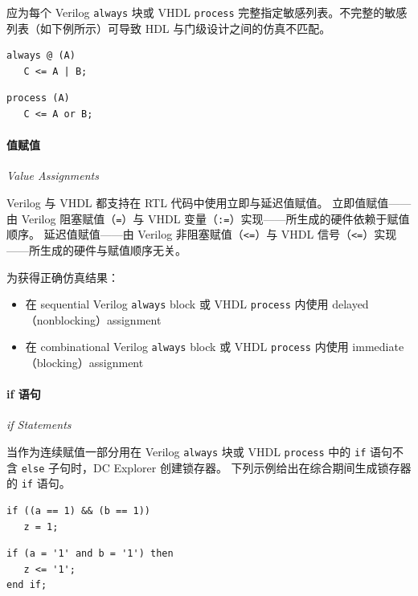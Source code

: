 应为每个 Verilog \texttt{always} 块或 VHDL \texttt{process} 完整指定敏感列表。不完整的敏感列表（如下例所示）可导致 HDL 与门级设计之间的仿真不匹配。

\begin{lstlisting}[caption={不完整的敏感列表（Verilog）},label=ex:sens-v]
always @ (A)
   C <= A | B;
\end{lstlisting}

\begin{lstlisting}[caption={不完整的敏感列表（VHDL）},label=ex:sens-vhdl]
process (A)
   C <= A or B;
\end{lstlisting}

\paragraph{值赋值}
\textit{Value Assignments}

Verilog 与 VHDL 都支持在 RTL 代码中使用立即与延迟值赋值。
立即值赋值——由 Verilog 阻塞赋值（\texttt{=}）与 VHDL 变量（\texttt{:=}）实现——所生成的硬件依赖于赋值顺序。
延迟值赋值——由 Verilog 非阻塞赋值（\texttt{<=}）与 VHDL 信号（\texttt{<=}）实现——所生成的硬件与赋值顺序无关。

为获得正确仿真结果：
\begin{itemize}
  \item 在 sequential Verilog \texttt{always} block 或 VHDL \texttt{process} 内使用 delayed（nonblocking）assignment
  \item 在 combinational Verilog \texttt{always} block 或 VHDL \texttt{process} 内使用 immediate（blocking）assignment
\end{itemize}

\paragraph{if 语句}
\textit{if Statements}

当作为连续赋值一部分用在 Verilog \texttt{always} 块或 VHDL \texttt{process} 中的 \texttt{if} 语句不含 \texttt{else} 子句时，DC Explorer 创建锁存器。
下列示例给出在综合期间生成锁存器的 \texttt{if} 语句。

\begin{lstlisting}[caption={不正确的 if 语句（Verilog）},label=ex:if-v]
if ((a == 1) && (b == 1))
   z = 1;
\end{lstlisting}

\begin{lstlisting}[caption={不正确的 if 语句（VHDL）},label=ex:if-vhdl]
if (a = '1' and b = '1') then
   z <= '1';
end if;
\end{lstlisting}

